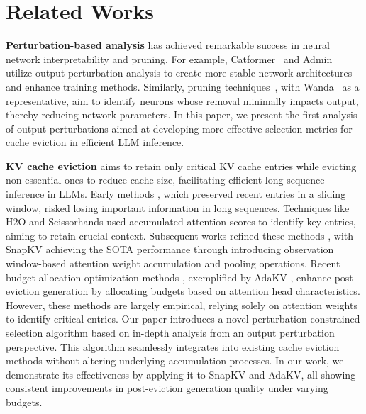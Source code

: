 \section{Related Works}

\textbf{Perturbation-based analysis} has achieved remarkable success in neural network interpretability and pruning. For example, Catformer~\cite{pmlr-v139-davis21a} and Admin~\cite{liu-etal-2020-understanding} utilize output perturbation analysis to create more stable network architectures and enhance training methods. Similarly, pruning techniques~\cite{learning, sparsegpt}, with Wanda~\cite{wanda} as a representative, aim to identify neurons whose removal minimally impacts output, thereby reducing network parameters.
In this paper, we present the first analysis of output perturbations aimed at developing more effective selection metrics for cache eviction in efficient LLM inference.

\textbf{KV cache eviction} aims to retain only critical KV cache entries while evicting non-essential ones to reduce cache size, facilitating efficient long-sequence inference in LLMs. Early methods \citep{streamingllm}, which preserved recent entries in a sliding window, risked losing important information in long sequences. Techniques like H2O \citep{h2o} and Scissorhands \citep{liu2024scissorhands} used accumulated attention scores to identify key entries, aiming to retain crucial context. Subsequent works refined these methods \citep{ ge2024modeltellsdiscardadaptive,adnan2024keyformer,ge2024model,SnapKV}, with SnapKV \citep{SnapKV} achieving the SOTA performance through introducing observation window-based attention weight accumulation and pooling operations. Recent budget allocation optimization methods \citep{yang2024pyramidinfer,pyramidkv}, exemplified by AdaKV \citep{ada}, enhance post-eviction generation by allocating budgets based on attention head characteristics. However, these methods are largely empirical, relying solely on attention weights to identify critical entries. Our paper introduces a novel perturbation-constrained selection algorithm based on in-depth analysis from an output perturbation perspective. This algorithm seamlessly integrates into existing cache eviction methods without altering underlying accumulation processes. In our work, we demonstrate its effectiveness by applying it to SnapKV and AdaKV, all showing consistent improvements in post-eviction generation quality under varying budgets.
